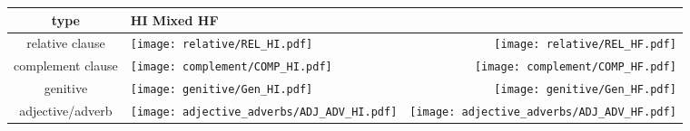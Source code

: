 \documentclass{article}
\begin{document}
\begin{table}[ht] 
   \begin{tabular}{  c | l  r } \hline 
        type & \multicolumn{2}{l}{\hspace{1cm} HI\hspace{3cm} Mixed\hspace{3cm} HF} \\
   \hline
 relative clause & \parbox[c]{14em}{\texttt{[image: relative/REL\_HI.pdf]}} &\parbox[c]{14em}{\texttt{[image: relative/REL\_HF.pdf]}} \\
 complement clause & \parbox[c]{14em}{\texttt{[image: complement/COMP\_HI.pdf]}} &\parbox[c]{14em}{\texttt{[image: complement/COMP\_HF.pdf]}} \\
genitive & \parbox[c]{14em}{\texttt{[image: genitive/Gen\_HI.pdf]}} &\parbox[c]{14em}{\texttt{[image: genitive/Gen\_HF.pdf]}} \\
adjective/adverb & \parbox[c]{14em}{\texttt{[image: adjective\_adverbs/ADJ\_ADV\_HI.pdf]}} &\parbox[c]{14em}{\texttt{[image: adjective\_adverbs/ADJ\_ADV\_HF.pdf]}} \\
    \hline
  \end{tabular}
\end{table}
\end{document}

